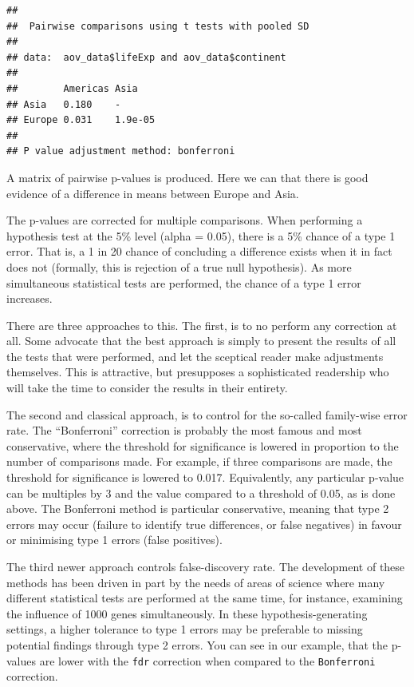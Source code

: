 \documentclass[12pt,]{krantz}
\theoremstyle{definition}
\theoremstyle{definition}
\theoremstyle{definition}
\theoremstyle{remark}
\begin{document}
\begin{verbatim}
## 
##  Pairwise comparisons using t tests with pooled SD 
## 
## data:  aov_data$lifeExp and aov_data$continent 
## 
##        Americas Asia   
## Asia   0.180    -      
## Europe 0.031    1.9e-05
## 
## P value adjustment method: bonferroni
\end{verbatim}


A matrix of pairwise p-values is produced. Here we can that there is
good evidence of a difference in means between Europe and Asia.

The p-values are corrected for multiple comparisons. When performing a
hypothesis test at the 5\% level (alpha = 0.05), there is a 5\% chance
of a type 1 error. That is, a 1 in 20 chance of concluding a difference
exists when it in fact does not (formally, this is rejection of a true
null hypothesis). As more simultaneous statistical tests are performed,
the chance of a type 1 error increases.

There are three approaches to this. The first, is to no perform any
correction at all. Some advocate that the best approach is simply to
present the results of all the tests that were performed, and let the
sceptical reader make adjustments themselves. This is attractive, but
presupposes a sophisticated readership who will take the time to
consider the results in their entirety.

The second and classical approach, is to control for the so-called
family-wise error rate. The ``Bonferroni'' correction is probably the
most famous and most conservative, where the threshold for significance
is lowered in proportion to the number of comparisons made. For example,
if three comparisons are made, the threshold for significance is lowered
to 0.017. Equivalently, any particular p-value can be multiples by 3 and
the value compared to a threshold of 0.05, as is done above. The
Bonferroni method is particular conservative, meaning that type 2 errors
may occur (failure to identify true differences, or false negatives) in
favour or minimising type 1 errors (false positives).

The third newer approach controls false-discovery rate. The development
of these methods has been driven in part by the needs of areas of
science where many different statistical tests are performed at the same
time, for instance, examining the influence of 1000 genes
simultaneously. In these hypothesis-generating settings, a higher
tolerance to type 1 errors may be preferable to missing potential
findings through type 2 errors. You can see in our example, that the
p-values are lower with the \texttt{fdr} correction when compared to the
\texttt{Bonferroni} correction.
\end{document}

